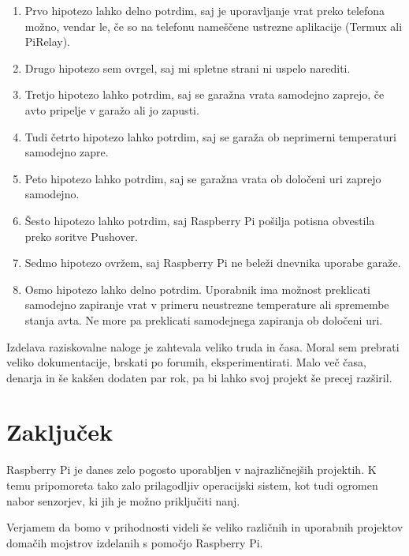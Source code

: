 \documentclass[11pt]{article}
\begin{document}
\begin{enumerate}
  \item Prvo hipotezo lahko delno potrdim, saj je uporavljanje vrat preko telefona možno, vendar le, če so na telefonu nameščene ustrezne aplikacije (Termux ali PiRelay).
  \item Drugo hipotezo sem ovrgel, saj mi spletne strani ni uspelo narediti.
  \item Tretjo hipotezo lahko potrdim, saj se garažna vrata samodejno zaprejo, če avto pripelje v garažo ali jo zapusti.
  \item Tudi četrto hipotezo lahko potrdim, saj se garaža ob neprimerni temperaturi samodejno zapre.
  \item Peto hipotezo lahko potrdim, saj se garažna vrata ob določeni uri zaprejo samodejno.
  \item Šesto hipotezo lahko potrdim, saj Raspberry Pi pošilja potisna obvestila preko soritve Pushover.
  \item Sedmo hipotezo ovržem, saj Raspberry Pi ne beleži dnevnika uporabe garaže.
  \item Osmo hipotezo lahko delno potrdim. Uporabnik ima možnost preklicati samodejno zapiranje vrat v primeru neustrezne temperature ali spremembe stanja avta. Ne more pa preklicati samodejnega zapiranja ob določeni uri.
\end{enumerate}
Izdelava raziskovalne naloge je zahtevala veliko truda in časa. Moral sem prebrati veliko dokumentacije, brskati po forumih, eksperimentirati. Malo več časa, denarja in še kakšen dodaten par rok, pa bi lahko svoj projekt še precej razširil.
\newpage
\section{Zaključek}
Raspberry Pi je danes zelo pogosto uporabljen v najrazličnejših projektih. K temu pripomoreta tako zalo prilagodljiv operacijski sistem, kot tudi ogromen nabor senzorjev, ki jih je možno priključiti nanj.

Verjamem da bomo v prihodnosti videli še veliko različnih in uporabnih projektov domačih mojstrov izdelanih s pomočjo Raspberry Pi.
\newpage
\clearpage


\end{document}
